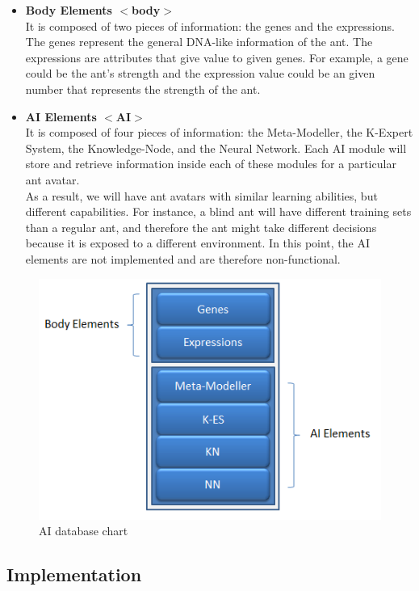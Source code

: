 \documentclass[titlepage, 12pt]{article}
\begin{document}
\begin{itemize}
\item {\bf Body Elements $<$body$>$}\\
It is composed of two pieces of information: the genes and the expressions. The genes represent the general DNA-like information of the ant. The expressions are attributes that give value to given genes. For example, a gene could be the ant's strength and the expression value could be an given number that represents the strength of the ant. 

\item {\bf AI Elements $<$AI$>$}\\
It is composed of four pieces of information: the Meta-Modeller, the K-Expert System, the Knowledge-Node, and the Neural Network. Each AI module will store and retrieve information inside each of these modules for a particular ant avatar. \\

As a result, we will have ant avatars with similar learning abilities, but different capabilities. For instance, a blind ant will have different training sets than a regular ant, and therefore the ant might take different decisions because it is exposed to a different environment. In this point, the AI elements are not implemented and are therefore non-functional. 
\end{itemize}

\newpage

\begin{figure}[h!]
    \centering
    \includegraphics{databasedesign.png}
    \caption{AI database chart}
\end{figure}

\subsection{Implementation}
\end{document}
